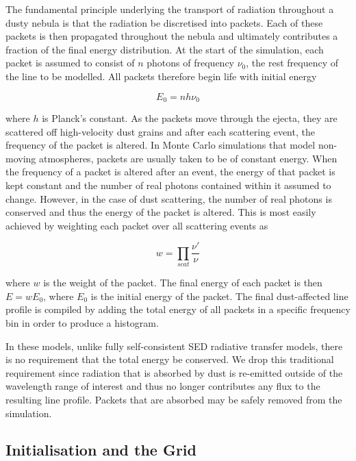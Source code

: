	The fundamental principle underlying the transport of radiation throughout a dusty nebula is that the radiation be discretised into packets.  Each of these packets is then propagated throughout the nebula and ultimately contributes a fraction of the final energy distribution.  At the start of the simulation, each packet is assumed to consist of $n$ photons of frequency $\nu_0$, the rest frequency of the line to be modelled.  All packets therefore begin life with initial energy

\begin{equation}
	E_0=nh\nu_0
\end{equation}
	
	
	where $h$ is Planck's constant.  As the packets move through the ejecta, they are scattered off high-velocity dust grains and after each scattering event, the frequency of the packet is altered.  In Monte Carlo simulations that model non-moving atmospheres, packets are usually taken to be of constant energy.  When the frequency of a packet is altered after an event, the energy of that packet is kept constant and the number of real photons contained within it assumed to change.  However, in the case of dust scattering, the number of real photons is conserved and thus the energy of the packet is altered.  This is most easily achieved by weighting each packet over all scattering events as 
	
\begin{equation}
	w=\prod_{scat} \frac{\nu'}{\nu}
\end{equation}

\noindent where $w$ is the weight of the packet.  The final energy of each packet is then $E =w E_0$, where $E_0$ is the initial energy of the packet.  The final dust-affected line profile is compiled by adding the total energy of all packets in a specific frequency bin in order to produce a histogram.
	
	In these models, unlike fully self-consistent SED radiative transfer models, there is no requirement that the total energy be conserved.  We drop this traditional requirement since radiation that is absorbed by dust is re-emitted outside of the wavelength range of interest and thus no longer contributes any flux to the resulting line profile.  Packets that are absorbed may be safely removed from the simulation.
	
	\subsection{Initialisation and the Grid}
	
